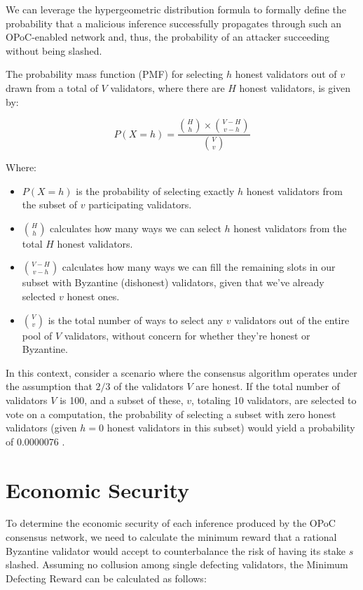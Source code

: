 \documentclass{article}
\begin{document}
We can leverage the hypergeometric distribution formula to formally define the probability that a malicious inference successfully propagates through such an OPoC-enabled network and, thus, the probability of an attacker succeeding without being slashed.


The probability mass function (PMF) for selecting \(h\) honest validators out of \(v\) drawn from a total of \(V\) validators, where there are \(H\) honest validators, is given by:


\[ P(X = h) = \frac{{H \choose h} \times {{V-H} \choose {v-h}}}{{V \choose v}} \]

Where:
\begin{itemize}
\item \(P(X = h)\) is the probability of selecting exactly \(h\) honest validators from the subset of \(v\) participating validators.
\item \(H \choose h\) calculates how many ways we can select \(h\) honest validators from the total \(H\) honest validators.
\item \({V-H} \choose {v-h}\) calculates how many ways we can fill the remaining slots in our subset with Byzantine (dishonest) validators, given that we've already selected \(v\) honest ones.
\item \(V \choose v\) is the total number of ways to select any \(v\) validators out of the entire pool of \(V\) validators, without concern for whether they're honest or Byzantine.

\end{itemize}

In this context, consider a scenario where the consensus algorithm operates under the assumption that \(2/3\) of the validators \(V\)  are honest. If the total number of validators \( V \) is 100, and a subset of these, \( v \), totaling 10 validators, are selected to vote on a computation, the probability of selecting a subset with zero honest validators (given \( h = 0 \) honest validators in this subset) would yield a probability of \( 0.0000076 \) .


\section{Economic Security}


To determine the economic security of each inference produced by the OPoC consensus network, we need to calculate the minimum reward that a rational Byzantine validator would accept to counterbalance the risk of having its stake \( s \) slashed. Assuming no collusion among single defecting validators, the Minimum Defecting Reward can be calculated as follows:
\end{document}
